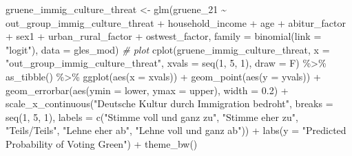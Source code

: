 \documentclass[
]{article}
\newenvironment{Shaded}{\begin{snugshade}}{\end{snugshade}}
\newcommand{\AttributeTok}[1]{\textcolor[rgb]{0.77,0.63,0.00}{#1}}
\newcommand{\CommentTok}[1]{\textcolor[rgb]{0.56,0.35,0.01}{\textit{#1}}}
\newcommand{\DecValTok}[1]{\textcolor[rgb]{0.00,0.00,0.81}{#1}}
\newcommand{\FloatTok}[1]{\textcolor[rgb]{0.00,0.00,0.81}{#1}}
\newcommand{\FunctionTok}[1]{\textcolor[rgb]{0.00,0.00,0.00}{#1}}
\newcommand{\NormalTok}[1]{#1}
\newcommand{\OtherTok}[1]{\textcolor[rgb]{0.56,0.35,0.01}{#1}}
\newcommand{\SpecialCharTok}[1]{\textcolor[rgb]{0.00,0.00,0.00}{#1}}
\newcommand{\StringTok}[1]{\textcolor[rgb]{0.31,0.60,0.02}{#1}}
\begin{document}
\begin{Shaded}
\begin{Highlighting}[]
\NormalTok{gruene\_immig\_culture\_threat }\OtherTok{\textless{}{-}} \FunctionTok{glm}\NormalTok{(gruene\_21 }\SpecialCharTok{\textasciitilde{}}\NormalTok{ out\_group\_immig\_culture\_threat }\SpecialCharTok{+}\NormalTok{ household\_income }\SpecialCharTok{+}\NormalTok{ age }\SpecialCharTok{+}\NormalTok{ abitur\_factor }\SpecialCharTok{+}\NormalTok{ sex1 }\SpecialCharTok{+}\NormalTok{ urban\_rural\_factor }\SpecialCharTok{+}\NormalTok{ ostwest\_factor, }\AttributeTok{family =} \FunctionTok{binomial}\NormalTok{(}\AttributeTok{link =} \StringTok{"logit"}\NormalTok{), }\AttributeTok{data =}\NormalTok{ gles\_mod)}
\CommentTok{\# plot }
\FunctionTok{cplot}\NormalTok{(gruene\_immig\_culture\_threat, }\AttributeTok{x =} \StringTok{"out\_group\_immig\_culture\_threat"}\NormalTok{,}
      \AttributeTok{xvals =} \FunctionTok{seq}\NormalTok{(}\DecValTok{1}\NormalTok{, }\DecValTok{5}\NormalTok{, }\DecValTok{1}\NormalTok{), }\AttributeTok{draw =}\NormalTok{ F) }\SpecialCharTok{\%\textgreater{}\%}
  \FunctionTok{as\_tibble}\NormalTok{() }\SpecialCharTok{\%\textgreater{}\%}
  \FunctionTok{ggplot}\NormalTok{(}\FunctionTok{aes}\NormalTok{(}\AttributeTok{x =}\NormalTok{ xvals)) }\SpecialCharTok{+}
  \FunctionTok{geom\_point}\NormalTok{(}\FunctionTok{aes}\NormalTok{(}\AttributeTok{y =}\NormalTok{ yvals)) }\SpecialCharTok{+}
  \FunctionTok{geom\_errorbar}\NormalTok{(}\FunctionTok{aes}\NormalTok{(}\AttributeTok{ymin =}\NormalTok{ lower, }\AttributeTok{ymax =}\NormalTok{ upper), }\AttributeTok{width =} \FloatTok{0.2}\NormalTok{) }\SpecialCharTok{+}
  \FunctionTok{scale\_x\_continuous}\NormalTok{(}\StringTok{"Deutsche Kultur durch Immigration bedroht"}\NormalTok{, }
                     \AttributeTok{breaks =} \FunctionTok{seq}\NormalTok{(}\DecValTok{1}\NormalTok{, }\DecValTok{5}\NormalTok{, }\DecValTok{1}\NormalTok{), }
                     \AttributeTok{labels =} \FunctionTok{c}\NormalTok{(}\StringTok{"Stimme voll und ganz zu"}\NormalTok{, }\StringTok{"Stimme eher zu"}\NormalTok{, }
                                \StringTok{"Teils/Teils"}\NormalTok{, }\StringTok{"Lehne eher ab"}\NormalTok{, }
                                \StringTok{"Lehne voll und ganz ab"}\NormalTok{)) }\SpecialCharTok{+}
  \FunctionTok{labs}\NormalTok{(}\AttributeTok{y =} \StringTok{"Predicted Probability of Voting Green"}\NormalTok{) }\SpecialCharTok{+}
  \FunctionTok{theme\_bw}\NormalTok{() }
\end{Highlighting}
\end{Shaded}
\end{document}
